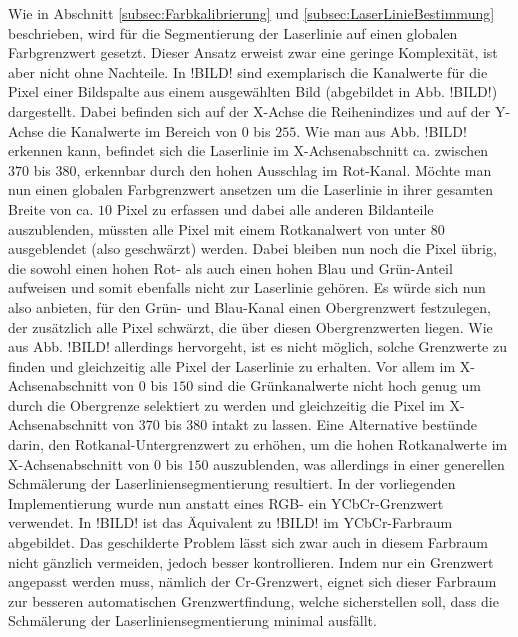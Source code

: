 Wie in Abschnitt \ref{subsec:Farbkalibrierung} und \ref{subsec:LaserLinieBestimmung} beschrieben, wird für die Segmentierung der Laserlinie auf einen globalen Farbgrenzwert gesetzt. Dieser Ansatz erweist zwar eine geringe Komplexität, ist aber nicht ohne Nachteile. In !BILD! sind exemplarisch die Kanalwerte für die Pixel einer Bildspalte aus einem ausgewählten Bild (abgebildet in Abb. !BILD!) dargestellt. Dabei befinden sich auf der X-Achse die Reihenindizes und auf der Y-Achse die Kanalwerte im Bereich von \(0\) bis \(255\). Wie man aus Abb. !BILD! erkennen kann, befindet sich die Laserlinie im X-Achsenabschnitt ca. zwischen \(370\) bis \(380\), erkennbar durch den hohen Ausschlag im Rot-Kanal. Möchte man nun einen globalen Farbgrenzwert ansetzen um die Laserlinie in ihrer gesamten Breite von ca. \(10\) Pixel zu erfassen und dabei alle anderen Bildanteile auszublenden, müssten alle Pixel mit einem Rotkanalwert von unter \(80\) ausgeblendet (also geschwärzt) werden. Dabei bleiben nun noch die Pixel übrig, die sowohl einen hohen Rot- als auch einen hohen Blau und Grün-Anteil aufweisen und somit ebenfalls nicht zur Laserlinie gehören. Es würde sich nun also anbieten, für den Grün- und Blau-Kanal einen Obergrenzwert festzulegen, der zusätzlich alle Pixel schwärzt, die über diesen Obergrenzwerten liegen. Wie aus Abb. !BILD! allerdings hervorgeht, ist es nicht möglich, solche Grenzwerte zu finden und gleichzeitig alle Pixel der Laserlinie zu erhalten. Vor allem im X-Achsenabschnitt von \(0\) bis \(150\) sind die Grünkanalwerte nicht hoch genug um durch die Obergrenze selektiert zu werden und gleichzeitig die Pixel im X-Achsenabschnitt von \(370\) bis \(380\) intakt zu lassen. Eine Alternative bestünde darin, den Rotkanal-Untergrenzwert zu erhöhen, um die hohen Rotkanalwerte im X-Achsenabschnitt von \(0\) bis \(150\) auszublenden, was allerdings in einer generellen Schmälerung der Laserliniensegmentierung resultiert.\linebreak
In der vorliegenden Implementierung wurde nun anstatt eines RGB- ein YCbCr-Grenzwert verwendet. In !BILD! ist das Äquivalent zu !BILD! im YCbCr-Farbraum abgebildet. Das geschilderte Problem lässt sich zwar auch in diesem Farbraum nicht gänzlich vermeiden, jedoch besser kontrollieren. Indem nur ein Grenzwert angepasst werden muss, nämlich der Cr-Grenzwert, eignet sich dieser Farbraum zur besseren automatischen Grenzwertfindung, welche sicherstellen soll, dass die Schmälerung der Laserliniensegmentierung minimal ausfällt.   
 \bigbreak
